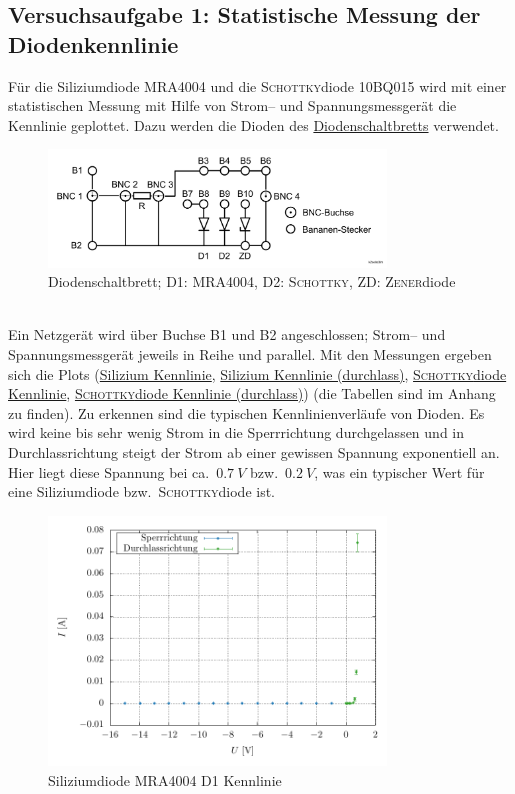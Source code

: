 \documentclass[a4paper,10pt]{article}
\numberwithin{equation}{section}
\begin{document}
\subsection{Versuchsaufgabe 1: Statistische Messung der Diodenkennlinie}
Für die Siliziumdiode MRA4004 und die \textsc{Schottky}diode 10BQ015 wird mit einer statistischen Messung mit Hilfe von Strom-- und Spannungsmessgerät die Kennlinie geplottet.
Dazu werden die Dioden des \hyperref[fig:diodenschaltbrett]{Diodenschaltbretts} verwendet.
\begin{figure}[h]
        \centering
        \includegraphics[width=0.8\textwidth]{diodenschaltbrett.png}
        \caption{Diodenschaltbrett; D1: MRA4004, D2: \textsc{Schottky}, ZD: \textsc{Zener}diode} \label{fig:diodenschaltbrett}
\end{figure}\\
Ein Netzgerät wird über Buchse B1 und B2 angeschlossen; Strom-- und Spannungsmessgerät jeweils in Reihe und parallel.
Mit den Messungen ergeben sich die Plots (\hyperref[fig:sidiode_kennlinie]{Silizium Kennlinie}, \hyperref[fig:sidiode_kennlinie_durchlass]{Silizium Kennlinie (durchlass)}, \hyperref[fig:schottky_kennlinie]{\textsc{Schottky}diode Kennlinie}, \hyperref[fig:schottky_kennlinie_durchlass]{\textsc{Schottky}diode Kennlinie (durchlass)}) (die Tabellen sind im Anhang zu finden).
Zu erkennen sind die typischen Kennlinienverläufe von Dioden.
Es wird keine bis sehr wenig Strom in die Sperrrichtung durchgelassen und in Durchlassrichtung steigt der Strom ab einer gewissen Spannung exponentiell an.
Hier liegt diese Spannung bei ca.\ $\SI{0.7}{V}$ bzw.\ $\SI{0.2}{V}$, was ein typischer Wert für eine Siliziumdiode bzw.\ \textsc{Schottky}diode ist.
\begin{figure}[h]
        \centering
        \includegraphics[width=0.8\textwidth]{plot/D1_crop.pdf}
        \caption{Siliziumdiode MRA4004 D1 Kennlinie} \label{fig:sidiode_kennlinie}
\end{figure}
\end{document}
